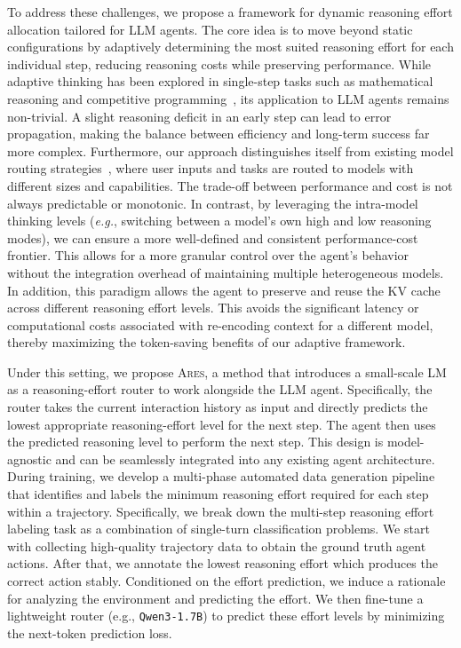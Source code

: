 \documentclass{article}
\newcommand{\ares}{\textsc{Ares}}
\theoremstyle{plain}
\theoremstyle{definition}
\theoremstyle{remark}
\begin{document}
To address these challenges, we propose a framework for dynamic reasoning effort allocation tailored for LLM agents. The core idea is to move beyond static configurations by adaptively determining the most suited reasoning effort for each individual step, reducing reasoning costs while preserving performance. While adaptive thinking has been explored in single-step tasks such as mathematical reasoning and competitive programming~\cite{shen2025dast,cui2025adaptive}, its application to LLM agents remains non-trivial. A slight reasoning deficit in an early step can lead to error propagation, making the balance between efficiency and long-term success far more complex. Furthermore, our approach distinguishes itself from existing model routing strategies~\cite{su2025toolorchestra,zhang2025router,amayuelas2025self}, where user inputs and tasks are routed to models with different sizes and capabilities. The trade-off between performance and cost is not always predictable or monotonic. In contrast, by leveraging the intra-model thinking levels (\textit{e.g.}, switching between a model's own high and low reasoning modes), we can ensure a more well-defined and consistent performance-cost frontier. This allows for a more granular control over the agent's behavior without the integration overhead of maintaining multiple heterogeneous models. In addition, this paradigm allows the agent to preserve and reuse the KV cache across different reasoning effort levels. This avoids the significant latency or computational costs associated with re-encoding context for a different model, thereby maximizing the token-saving benefits of our adaptive framework.

Under this setting, we propose {\ares}, a method that introduces a small-scale LM as a reasoning-effort router to work alongside the LLM agent. Specifically, the router takes the current interaction history as input and directly predicts the lowest appropriate reasoning-effort level for the next step. The agent then uses the predicted reasoning level to perform the next step. This design is model-agnostic and can be seamlessly integrated into any existing agent architecture.
During training, we develop a multi-phase automated data generation pipeline that identifies and labels the minimum reasoning effort required for each step within a trajectory. Specifically, we break down the multi-step reasoning effort labeling task as a combination of single-turn classification problems. We start with collecting high-quality trajectory data to obtain the ground truth agent actions. After that, we annotate the lowest reasoning effort which produces the correct action stably. Conditioned on the effort prediction, we induce a rationale for analyzing the environment and predicting the effort. 
We then fine-tune a lightweight router (e.g., \texttt{Qwen3-1.7B}) to predict these effort levels by minimizing the next-token prediction loss.
\end{document}
